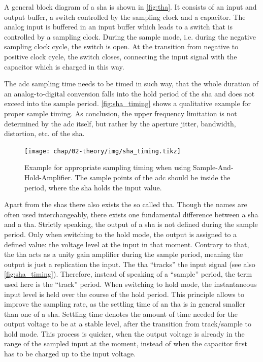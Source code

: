 A general block diagram of a \gls{sha} is shown in \autoref{fig:tha}. 
It consists of an input and output buffer, a switch controlled by the sampling clock and a capacitor.
The analog input is buffered in an input buffer which leads to a switch that is controlled by a sampling clock.
During the sample mode, i.e. during the negative sampling clock cycle, the switch is open.
At the transition from negative to positive clock cycle, the switch closes, connecting the input signal with the capacitor which is charged in this way.

The \gls{adc} sampling time needs to be timed in such way, that the whole duration of an analog-to-digital conversion falls into the hold period of the \gls{sha} and does not exceed into the sample period. 
\autoref{fig:sha_timing} shows a qualitative example for proper sample timing. 
As conclusion, the upper frequency limitation is not determined by the \gls{adc} itself, but rather by the aperture jitter, bandwidth, distortion, etc. of the \gls{sha}. \cite{walt}

\begin{figure} [H]
	\centering
	\tikzexternaldisable
	\texttt{[image: chap/02-theory/img/sha\_timing.tikz]}  
	\tikzexternalenable
	\caption[SHA timing example]{Example for appropriate sampling timing when using Sample-And-Hold-Amplifier. The sample points of the \gls{adc} should be inside the period, where the \gls{sha} holds the input value.}
	\label{fig:sha_timing}
\end{figure}
Apart from the \glspl{sha} there also exists the so called \gls{tha}.
Though the names are often used interchangeably, there exists one fundamental difference between a \gls{sha} and a \gls{tha}.
Strictly speaking, the output of a \gls{sha} is not defined during the sample period. 
Only when switching to the hold mode, the output is assigned to a defined value: the voltage level at the input in that moment.
Contrary to that, the \gls{tha} acts as a unity gain amplifier during the sample period, meaning the output is just a replication the input. 
The \gls{tha} ``tracks'' the input signal (see also \autoref{fig:sha_timing}).
Therefore, instead of speaking of a ``sample'' period, the term used here is the ``track'' period.
When switching to hold mode, the instantaneous input level is held over the course of the hold period.
This principle allows to improve the sampling rate, as the settling time of an \gls{tha} is in general smaller than one of a \gls{sha}.
Settling time denotes the amount of time needed for the output voltage to be at a stable level, after the transition from track/sample to hold mode.
This process is quicker, when the output voltage is already in the range of the sampled input at the moment, instead of when the capacitor first has to be charged up to the input voltage. \cite{Reeder2017}


